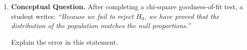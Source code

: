 \documentclass[10pt]{article}
\begin{document}
\begin{enumerate}
        \begin{enumerate}[label=\alph*.]
          \item State $H_0$ and $H_a$ for a chi-square goodness-of-fit test.
          \item Calculate the expected count for each service and compute the
                chi-square test statistic. Show your work.
          \item State the degrees of freedom: $df =$ \blank{2cm}
          \item The p-value is less than 0.001. Interpret this p-value in context,
                then state a complete conclusion at $\alpha = 0.05$.
        \end{enumerate}

  \item \textbf{Conceptual Question.} After completing a chi-square goodness-of-fit test,
        a student writes: \textit{``Because we fail to reject $H_0$, we have proved that
        the distribution of the population matches the null proportions.''}

        Explain the error in this statement.


\end{enumerate}
\end{document}
